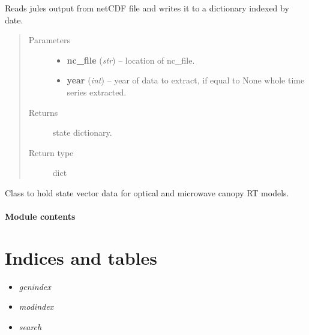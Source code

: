\documentclass[letterpaper,10pt,english]{sphinxmanual}
\begin{document}
\begin{fulllineitems}
\label{source/sentinel_simulator:sentinel_simulator.stateVector.read_jules}
Reads jules output from netCDF file and writes it to a dictionary indexed by date.
\begin{quote}\begin{description}
\item[{Parameters}] \leavevmode\begin{itemize}
\item {} 
\textbf{nc\_file} (\emph{str}) -- location of nc\_file.

\item {} 
\textbf{year} (\emph{int}) -- year of data to extract, if equal to None whole time series extracted.

\end{itemize}

\item[{Returns}] \leavevmode
state dictionary.

\item[{Return type}] \leavevmode
dict

\end{description}\end{quote}

\end{fulllineitems}


\begin{fulllineitems}
\label{source/sentinel_simulator:sentinel_simulator.stateVector.stateVector}
Class to hold state vector data for optical
and microwave canopy RT models.

\end{fulllineitems}



\subsubsection{Module contents}
\label{source/sentinel_simulator:module-sentinel_simulator}\label{source/sentinel_simulator:module-contents}

\chapter{Indices and tables}
\label{index:indices-and-tables}\begin{itemize}
\item {} 
\emph{genindex}

\item {} 
\emph{modindex}

\item {} 
\emph{search}

\end{itemize}
\end{document}

